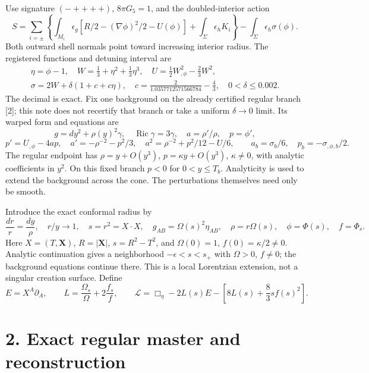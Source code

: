 \documentclass[
  10pt,
]{article}
\begin{document}
Use signature \((-++++)\), \(8\pi G_5=1\), and the doubled-interior
action \[
 S=\sum_{i=\pm}\left\{\int_{M_i}\!\epsilon_g
 [R/2-(\nabla\phi)^2/2-U(\phi)]+\int_\Sigma\!\epsilon_hK_i\right\}
 -\int_\Sigma\!\epsilon_h\sigma(\phi).                         \tag{1}
\] Both outward shell normals point toward increasing interior radius.
The registered functions and detuning interval are \[
 \begin{gathered}
 \eta=\phi-1,\quad W=\tfrac13+\eta^2+\tfrac13\eta^3,\quad
 U=\tfrac12W_{,\phi}^2-\tfrac23W^2,\\
 \sigma=2W+\delta(1+c+c\eta),\quad
 c=\frac2{1.0357712571566784}-\frac43,\quad0<\delta\le0.002.
 \end{gathered}                                               \tag{2}
\] The decimal is exact. Fix one background on the already certified
regular branch {[}2{]}; this note does not recertify that branch or take
a uniform \(\delta\to0\) limit. Its warped form and equations are \[
 g=dy^2+\rho(y)^2\gamma,\quad\operatorname{Ric}\gamma=3\gamma,
 \quad a=\rho'/\rho,\quad p=\phi',
\] \[
 p'=U_{,\phi}-4ap,\quad a'=-\rho^{-2}-p^2/3,\quad
 a^2=\rho^{-2}+p^2/12-U/6,
 \qquad a_b=\sigma_b/6,\quad p_b=-\sigma_{,\phi,b}/2.             \tag{3}
\] The regular endpoint has \(\rho=y+O(y^3)\), \(p=\kappa y+O(y^3)\),
\(\kappa\ne0\), with analytic coefficients in \(y^2\). On this fixed
branch \(p<0\) for \(0<y\le T_b\). Analyticity is used to extend the
background across the cone. The perturbations themselves need only be
smooth.

Introduce the exact conformal radius by \[
 \frac{dr}{r}=\frac{dy}{\rho},\quad r/y\longrightarrow1,\quad
 s=r^2=X\cdot X,\quad g_{AB}=\Omega(s)^2\eta_{AB},\quad
 \rho=r\Omega(s),\quad\phi=\Phi(s),\quad f=\Phi_s.               \tag{4}
\] Here \(X=(T,\mathbf X)\), \(R=|\mathbf X|\), \(s=R^2-T^2\), and
\(\Omega(0)=1\), \(f(0)=\kappa/2\ne0\). Analytic continuation gives a
neighborhood \(-\epsilon<s<s_+\) with \(\Omega>0\), \(f\ne0\); the
background equations continue there. This is a local Lorentzian
extension, not a singular creation surface. Define \[
 E=X^A\partial_A,\qquad
 L=\frac{\Omega_s}{\Omega}+2\frac{f_s}{f},\qquad
 \mathcal L=\Box_\eta-2L(s)E-
 \left[8L(s)+\frac83sf(s)^2\right].                            \tag{5}
\]

\section{2. Exact regular master and
reconstruction}\label{exact-regular-master-and-reconstruction}
\end{document}
